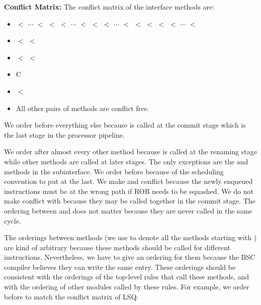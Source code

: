 \noindent\textbf{Conflict Matrix:}
The conflict matrix of the interface methods are:
\begin{itemize}
    \item {} $<$ $\cdots$ $<$  $<$  $<$ $\cdots$ $<$  $<$  $<$ $\cdots$ $<$  $<$  $<$  $<$  $<$ $\cdots$ $<$ 
    \item {} $<$  $<$ 
    \item {} $<$  $<$ 
    \item {} C 
    \item {} $<$ 
    \item All other pairs of methods are conflict free.
\end{itemize}

We order  before everything else because  is called at the commit stage which is the last stage in the processor pipeline.

We order  after almost every other method because  is called at the renaming stage while other methods are called at later stages.
The only exceptions are the  and  methods in the  subinterface.
We order  before  because of the scheduling convention to put  at the last.
We make  and  conflict because the newly enqueued instructions must be at the wrong path if ROB needs to be squashed.
We do not make  conflict with  because they may be called together in the commit stage.
The ordering between  and  does not matter because they are never called in the same cycle.

The orderings between  methods (we use  to denote all the methods starting with ) are kind of arbitrary because these methods should be called for different instructions.
Nevertheless, we have to give an ordering for them because the BSC compiler believes they can write the same entry.
These orderings should be consistent with the orderings of the top-level rules that call these methods, and with the ordering of other modules called by these rules.
For example, we order  before  to match the conflict matrix of LSQ.

